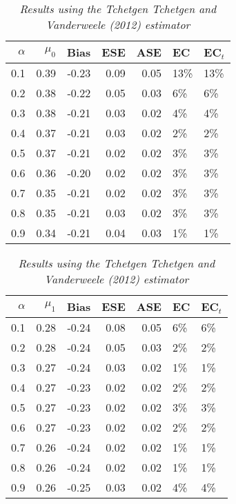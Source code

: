\documentclass[12pt, letterpaper]{article}
\begin{document}
\begin{table}[ht!]
	\centering
	\bgroup
	\def\arraystretch{1.25}
	\setlength\tabcolsep{0.05in}
	\begin{tabular}{rrrrrll} 
		\hline
		$\alpha$ & $\mu_0$ & Bias & ESE & ASE & EC & EC$_t$ \\ \hline
		0.1 & 0.39 & -0.23 & 0.09 & 0.05 & 13\% & 13\% \\ 
		0.2 & 0.38 & -0.22 & 0.05 & 0.03 & 6\% & 6\% \\ 
		0.3 & 0.38 & -0.21 & 0.03 & 0.02 & 4\% & 4\% \\ 
		0.4 & 0.37 & -0.21 & 0.03 & 0.02 & 2\% & 2\% \\ 
		0.5 & 0.37 & -0.21 & 0.02 & 0.02 & 3\% & 3\% \\ 
		0.6 & 0.36 & -0.20 & 0.02 & 0.02 & 3\% & 3\% \\ 
		0.7 & 0.35 & -0.21 & 0.02 & 0.02 & 3\% & 3\% \\ 
		0.8 & 0.35 & -0.21 & 0.03 & 0.02 & 3\% & 3\% \\ 
		0.9 & 0.34 & -0.21 & 0.04 & 0.03 & 1\% & 1\% \\ 
		\hline
	\end{tabular}
	\egroup
	\quad 
	\bgroup
	\setlength\tabcolsep{0.05in}
	\def\arraystretch{1.25}
	\begin{tabular}{rrrrrll}
		\hline
		$\alpha$ & $\mu_1$ & Bias & ESE & ASE & EC & EC$_t$ \\ \hline
		0.1 & 0.28 & -0.24 & 0.08 & 0.05 & 6\% & 6\% \\ 
		0.2 & 0.28 & -0.24 & 0.05 & 0.03 & 2\% & 2\% \\ 
		0.3 & 0.27 & -0.24 & 0.03 & 0.02 & 1\% & 1\% \\ 
		0.4 & 0.27 & -0.23 & 0.02 & 0.02 & 2\% & 2\% \\ 
		0.5 & 0.27 & -0.23 & 0.02 & 0.02 & 3\% & 3\% \\ 
		0.6 & 0.27 & -0.23 & 0.02 & 0.02 & 2\% & 2\% \\ 
		0.7 & 0.26 & -0.24 & 0.02 & 0.02 & 1\% & 1\% \\ 
		0.8 & 0.26 & -0.24 & 0.02 & 0.02 & 1\% & 1\% \\ 
		0.9 & 0.26 & -0.25 & 0.03 & 0.02 & 4\% & 4\% \\ 
		\hline
	\end{tabular}
	\egroup
	\caption*{
		\textit{Results using the Tchetgen Tchetgen and Vanderweele (2012) estimator}	
	}
\end{table}

\clearpage

\end{document}
